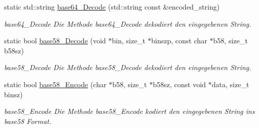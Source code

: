 \begin{DoxyCompactItemize}
static std\+::string \hyperlink{classuCrypt_1_1uCryptLib_a42779f1cd3de333c6628a7db87085f46}{base64\+\_\+\+Decode} (std\+::string const \&encoded\+\_\+string)
\begin{DoxyCompactList}\small\item\em base64\+\_\+\+Decode Die Methode base64\+\_\+\+Decode dekodiert den eingegebenen String. \end{DoxyCompactList}\item 
static bool \hyperlink{classuCrypt_1_1uCryptLib_ab01e2676427095bffb5315cd71ab2beb}{base58\+\_\+\+Decode} (void $\ast$bin, size\+\_\+t $\ast$binszp, const char $\ast$b58, size\+\_\+t b58sz)
\begin{DoxyCompactList}\small\item\em base58\+\_\+\+Decode Die Methode base58\+\_\+\+Decode dekodiert den eingegebenen String. \end{DoxyCompactList}\item 
static bool \hyperlink{classuCrypt_1_1uCryptLib_a67bbd554f2178f2566d2c5764b9abccc}{base58\+\_\+\+Encode} (char $\ast$b58, size\+\_\+t $\ast$b58sz, const void $\ast$data, size\+\_\+t binsz)
\begin{DoxyCompactList}\small\item\em base58\+\_\+\+Encode Die Methode base58\+\_\+\+Encode kodiert den eingegebenen String ins base58 Format. \end{DoxyCompactList}\end{DoxyCompactItemize}
